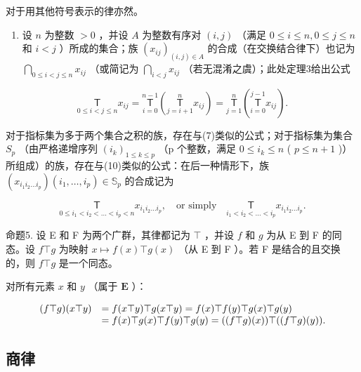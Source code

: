 对于用其他符号表示的律亦然。

\begin{enumerate}
\def\labelenumi{\arabic{enumi}.}
\setcounter{enumi}{1}
\tightlist
\item
  设 \(n\) 为整数 \(>0\) ，并设 \(A\) 为整数有序对 \((i,j)\) （满足 \(0 \leqslant i \leqslant n, 0 \leqslant j \leqslant n\) 和 \(i < j\) ）所成的集合；族 \((x_{ij})_{(i,j) \in A}\) 的合成（在交换结合律下）也记为 \(\bigcap_{0 \leqslant i < j \leqslant n} x_{ij}\) （或简记为 \(\bigcap_{i < j} x_{ij}\) （若无混淆之虞）；此处定理3给出公式
\end{enumerate}

\[
\underset {0 \leqslant i <   j \leqslant n} {\mathsf {T}} x _ {i j} = \underset {i = 0} {\overset {n - 1} {\mathsf {T}}} \left(\underset {j = i + 1} {\overset {n} {\mathsf {T}}} x _ {i j}\right) = \underset {j = 1} {\overset {n} {\mathsf {T}}} \left(\underset {i = 0} {\overset {j - 1} {\mathsf {T}}} x _ {i j}\right).\tag{10}
\]

对于指标集为多于两个集合之积的族，存在与(7)类似的公式；对于指标集为集合 \(S_{p}\) （由严格递增序列 \((i_{k})_{1\leqslant k\leqslant p}\) （p 个整数，满足 \(0\leqslant i_{k}\leqslant n\) ( \(p\leqslant n+1\) )）所组成）的族，存在与(10)类似的公式：在后一种情形下，族 \((x_{i_{1}i_{2}\ldots i_{p}})(i_{1},\ldots,i_{p})\in\mathbb{S}_{p}\) 的合成记为

\[
\underset {0 \leqslant i _ {1} <   i _ {2} <   \dots <   i _ {p} <   n} {\mathsf {T}} x _ {i _ {1} i _ {2} \ldots i _ {p}}, \quad \text {or simply} \quad \underset {i _ {1} <   i _ {2} <   \dots <   i _ {p}} {\mathsf {T}} x _ {i _ {1} i _ {2} \ldots i _ {p}}.
\]

命题5. 设 E 和 F 为两个广群，其律都记为 \(\top\) ，并设 \(f\) 和 \(g\) 为从 E 到 F 的同态。设 \(f \top g\) 为映射 \(x \mapsto f(x) \top g(x)\) （从 E 到 F ）。若 F 是结合的且交换的，则 \(f \top g\) 是一个同态。

对所有元素 \(x\) 和 \(y\) （属于 \(\mathbf{E}\) ）：

\[
\begin{array}{r l} (f \top g) (x \top y) & = f (x \top y) \top g (x \top y) = f (x) \top f (y) \top g (x) \top g (y) \\ & = f (x) \top g (x) \top f (y) \top g (y) = ((f \top g) (x)) \top ((f \top g) (y)). \end{array}
\]

\subsection{商律}

